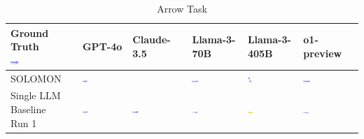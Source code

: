 \begin{table}
  \caption{Arrow Task}
  \label{table:arrow}
  \centering
  \begin{tabularx}{\textwidth}{@{}XXXXXX@{}}
    \toprule
    \makecell{Ground Truth \\ \includegraphics[width=0.13\textwidth]{examples_png/Arrow.png}} & GPT-4o & Claude-3.5 & Llama-3-70B & Llama-3-405B & o1-preview \\
    \midrule
    SOLOMON & \includegraphics[width=0.13\textwidth]{./pool_all/png/gpt-4o_results/Arrow.png} &  & \includegraphics[width=0.13\textwidth]{./pool_all/png/claude-3-5-sonnet-20240620_results/Arrow.png} & \includegraphics[width=0.13\textwidth]{./pool_all/png/watsonx_meta-llama_llama-3-1-70b-instruct_results/Arrow.png} & \includegraphics[width=0.13\textwidth]{./pool_all/png/watsonx_meta-llama_llama-3-405b-instruct_results/Arrow.png} \\
    \makecell{Single LLM \\ Baseline \\ Run 1} & \includegraphics[width=0.13\textwidth]{./run_1/png/gpt-4o_results/Arrow.png} & \includegraphics[width=0.13\textwidth]{./run_1/png/o1-preview_results/Arrow.png} & \includegraphics[width=0.13\textwidth]{./run_1/png/claude-3-5-sonnet-20240620_results/Arrow.png} & \includegraphics[width=0.13\textwidth]{./run_1/png/watsonx_meta-llama_llama-3-1-70b-instruct_results/Arrow.png} & \includegraphics[width=0.13\textwidth]{./run_1/png/watsonx_meta-llama_llama-3-405b-instruct_results/Arrow.png} \\

\end{tabularx}
\end{table}
